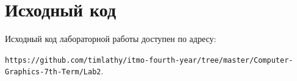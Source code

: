 \documentclass[listings]{labreport}
\begin{document}
\newpage
\section*{Исходный код}

Исходный код лабораторной работы доступен по адресу:

\verb|https://github.com/timlathy/itmo-fourth-year/tree/master/Computer-Graphics-7th-Term/Lab2|.
\end{document}
